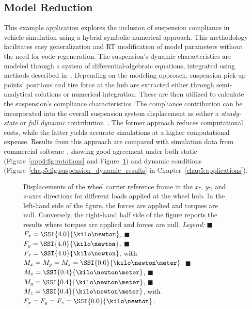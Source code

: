 \subsection{Model Reduction}

This example application explores the inclusion of suspension compliance in vehicle simulation using a hybrid symbolic-numerical approach. This methodology facilitates easy generalization and \ac{RT} modification of model parameters without the need for code regeneration. The suspension's dynamic characteristics are modeled through a system of differential-algebraic equations, integrated using methods described in~\cite{larcher2024imece_symbolic}. Depending on the modeling approach, suspension pick-up points' positions and tire force at the hub are extracted either through semi-analytical solutions or numerical integration. These are then utilized to calculate the suspension's compliance characteristics. The compliance contribution can be incorporated into the overall suspension system displacement as either a \emph{steady-state} or \emph{full dynamic} contribution~\cite{larcher2024imece_symbolic}. The former approach reduces computational costs, while the latter yields accurate simulations at a higher computational expense. Results from this approach are compared with simulation data from commercial software \Ansys{}, showing good agreement under both static (Figure~\ref{app4:fig:rotations} and Figure~\ref{app4:fig:translations}) and dynamic conditions (Figure~\ref{chap5:fig:suspension_dynamic_results} in Chapter~\ref{chap5:applications}).

\begin{figure}[htb]
  \centering
  \small{}
  \caption{Displacements of the wheel carrier reference frame in the $x$-, $y$-, and $z$-axes directions for different loads applied at the wheel hub. In the left-hand side of the figure, the forces are applied and torques are null. Conversely, the right-hand half side of the figure reports the results where torques are applied and forces are null. \emph{Legend:} {\color{mycolor1}$\blacksquare$}~$F_x = \SSI{4.0}{\kilo\newton}$, {\color{mycolor2}$\blacksquare$}~$F_y = \SSI{4.0}{\kilo\newton}$, {\color{mycolor3}$\blacksquare$}~$F_z = \SSI{4.0}{\kilo\newton}$, with $M_x = M_y = M_z = \SSI{0.0}{\kilo\newton\meter}$. {\color{mycolor4}$\blacksquare$}~$M_x = \SSI{0.4}{\kilo\newton\meter}$, {\color{mycolor5}$\blacksquare$}~$M_y = \SSI{0.4}{\kilo\newton\meter}$, {\color{mycolor6}$\blacksquare$}~$M_z = \SSI{0.4}{\kilo\newton\meter}$, with $F_x = F_y = F_z = \SSI{0.0}{\kilo\newton}$.}
  \label{app4:fig:translations}
\end{figure}

